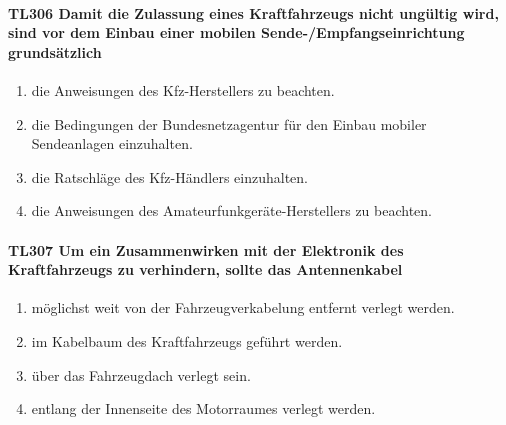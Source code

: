 \documentclass[8pt]{article}
\begin{document}
\paragraph*{TL306 Damit die Zulassung eines Kraftfahrzeugs nicht ungültig wird, sind vor dem Einbau einer mobilen Sende-/Empfangseinrichtung grundsätzlich}
\begin{enumerate}[nolistsep,label=\Alph*]
\item die Anweisungen des Kfz-Herstellers zu beachten.
\item die Bedingungen der Bundesnetzagentur für den Einbau mobiler Sendeanlagen einzuhalten.
\item die Ratschläge des Kfz-Händlers einzuhalten.
\item die Anweisungen des Amateurfunkgeräte-Herstellers zu beachten.
\end{enumerate}

\paragraph*{TL307 Um ein Zusammenwirken mit der Elektronik des Kraftfahrzeugs zu verhindern, sollte das Antennenkabel}
\begin{enumerate}[nolistsep,label=\Alph*]
\item möglichst weit von der Fahrzeugverkabelung entfernt verlegt werden.
\item im Kabelbaum des Kraftfahrzeugs geführt werden.
\item über das Fahrzeugdach verlegt sein.
\item entlang der Innenseite des Motorraumes verlegt werden.
\end{enumerate}
\end{document}
